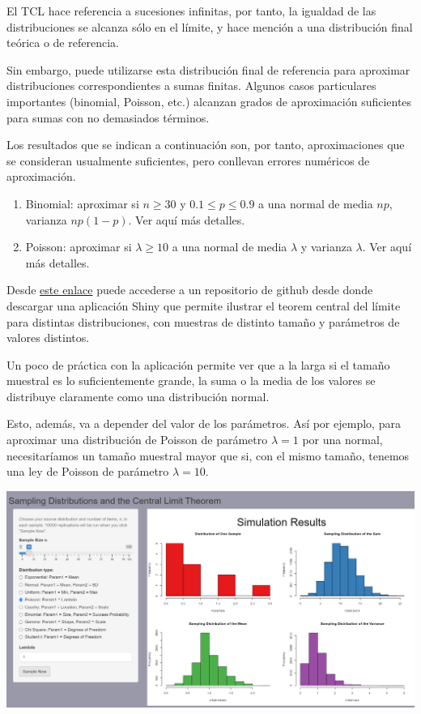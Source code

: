 \documentclass[
]{article}
\begin{document}
El TCL hace referencia a sucesiones infinitas, por tanto, la igualdad de las distribuciones se alcanza sólo en el límite, y hace mención a una distribución final teórica o de referencia.

Sin embargo, puede utilizarse esta distribución final de referencia para aproximar distribuciones correspondientes a sumas finitas. Algunos casos particulares importantes (binomial, Poisson, etc.) alcanzan grados de aproximación suficientes para sumas con no demasiados términos.

Los resultados que se indican a continuación son, por tanto, aproximaciones que se consideran usualmente suficientes, pero conllevan errores numéricos de aproximación.

\begin{enumerate}
\def\labelenumi{\arabic{enumi}.}
\item
  Binomial: aproximar si \(n \geq 30\) y \(0.1 \leq p \leq 0.9\) a una normal de media \(n p\), varianza \(n p(1-p)\). Ver aquí más detalles.
\item
  Poisson: aproximar si \(\lambda \geq 10\) a una normal de media \(\lambda\) y varianza \(\lambda\). Ver aquí más detalles.
\end{enumerate}

Desde \href{https://github.com/ASPteaching/simple-CLT-Demo}{este enlace} puede accederse a un repositorio de github desde donde descargar una aplicación Shiny que permite ilustrar el teorem central del límite para distintas distribuciones, con muestras de distinto tamaño y parámetros de valores distintos.

Un poco de práctica con la aplicación permite ver que a la larga si el tamaño muestral es lo suficientemente grande, la suma o la media de los valores se distribuye claramente como una distribución normal.

Esto, además, va a depender del valor de los parámetros. Así por ejemplo, para aproximar una distribución de Poisson de parámetro \(\lambda=1\) por una normal, necesitaríamos un tamaño muestral mayor que si, con el mismo tamaño, tenemos una ley de Poisson de parámetro \(\lambda=10\).

\begin{center}\includegraphics[width=1\linewidth]{images/simPoisson_1_11} \end{center}
\end{document}
